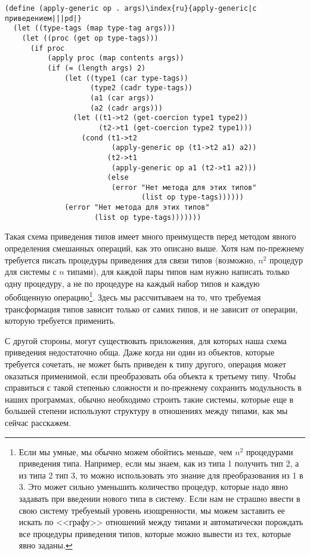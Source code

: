 \begin{Verbatim}[fontsize=\small]
(define (apply-generic op . args)\index{ru}{apply-generic|с приведением|||pd|}
  (let ((type-tags (map type-tag args)))
    (let ((proc (get op type-tags)))
      (if proc
          (apply proc (map contents args))
          (if (= (length args) 2)
              (let ((type1 (car type-tags))
                    (type2 (cadr type-tags))
                    (a1 (car args))
                    (a2 (cadr args)))
                (let ((t1->t2 (get-coercion type1 type2))
                      (t2->t1 (get-coercion type2 type1)))
                  (cond (t1->t2
                         (apply-generic op (t1->t2 a1) a2))
                        (t2->t1
                         (apply-generic op a1 (t2->t1 a2)))
                        (else
                         (error "Нет метода для этих типов"
                                (list op type-tags))))))
              (error "Нет метода для этих типов"
                     (list op type-tags)))))))
\end{Verbatim}

Такая схема приведения типов имеет много преимуществ
перед методом явного определения смешанных операций, как это описано
выше.  Хотя нам по-прежнему требуется писать процедуры приведения для
связи типов (возможно, $n^2$ процедур для
системы с $n$ типами), для каждой пары типов нам
нужно написать только одну процедуру, а не по процедуре на каждый набор
типов и каждую обобщенную операцию\footnote{Если мы умные, мы обычно можем обойтись меньше, чем
$n^2$ процедурами приведения типа.  Например,
если мы знаем, как из типа 1 получить тип 2, а из типа 2 тип 3, то
можно использовать это знание для преобразования из 1 в 3.  Это может
сильно уменьшить количество процедур, которые надо явно задавать при введении
нового типа в систему.  Если нам не страшно ввести в свою систему
требуемый уровень изощренности, мы можем заставить ее искать по
<<графу>> отношений между типами и автоматически порождать все процедуры
приведения типов, которые можно вывести из тех, которые явно заданы.}.
Здесь мы рассчитываем на то, что требуемая трансформация типов зависит
только от самих типов, и не зависит от операции, которую требуется применить.

С другой стороны, могут существовать приложения, для
которых наша схема приведения недостаточно обща.  Даже когда ни один из
объектов, которые требуется сочетать, не может быть приведен к типу
другого, операция может оказаться применимой, если
преобразовать оба объекта к третьему типу.  Чтобы справиться с такой степенью
сложности и по-прежнему сохранить модульность в наших программах,
обычно необходимо строить такие системы, которые еще в большей степени
используют структуру в отношениях между типами, как мы сейчас
расскажем.

